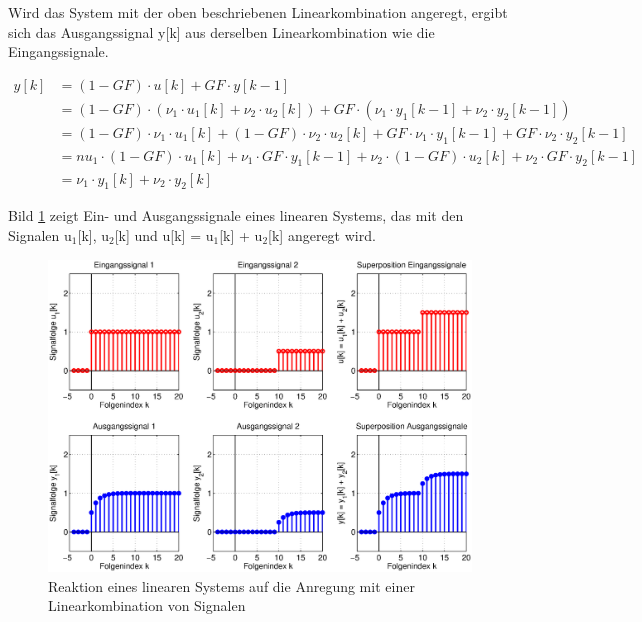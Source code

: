 \noindent Wird das System mit der oben beschriebenen Linearkombination angeregt, ergibt sich das Ausgangssignal y[k] aus derselben Linearkombination wie die Eingangssignale.

\begin{equation}\label{eq:fourtwentyfive}
\begin{split}
y\left[k\right] & = \left(1-GF\right)\cdot u\left[k\right]+GF\cdot y\left[k-1\right] \\ 
& = \left(1-GF\right)\cdot \left(\nu _{1} \cdot u_{1} \left[k\right]+\nu _{2} \cdot u_{2} \left[k\right]\right)+GF\cdot \left(\nu _{1} \cdot y_{1} \left[k-1\right]+\nu _{2} \cdot y_{2} \left[k-1\right]\right) \\ 
& = \left(1-GF\right)\cdot \nu _{1} \cdot u_{1} \left[k\right]+\left(1-GF\right)\cdot \nu _{2} \cdot u_{2} \left[k\right]+GF\cdot \nu _{1} \cdot y_{1} \left[k-1\right]+GF\cdot \nu _{2} \cdot y_{2} \left[k-1\right] \\ 
& = nu _{1} \cdot \left(1-GF\right)\cdot u_{1} \left[k\right]+\nu _{1} \cdot GF\cdot y_{1} \left[k-1\right]+\nu _{2} \cdot \left(1-GF\right)\cdot u_{2} \left[k\right]+\nu _{2} \cdot GF\cdot y_{2} \left[k-1\right] \\ 
& = \nu _{1} \cdot y_{1} \left[k\right]+\nu _{2} \cdot y_{2} \left[k\right]
\end{split}
\end{equation}

\noindent Bild \ref{fig:RekursivTiefpassLinearitaet} zeigt Ein- und Ausgangssignale eines linearen Systems, das mit den Signalen u${}_{1}$[k], u${}_{2}$[k] und u[k] = u${}_{1}$[k] + u${}_{2}$[k] angeregt wird. 

\begin{figure}[H]
  \centerline{\includegraphics[width=1\textwidth]{Kapitel4/Bilder/image7.eps}}
  \caption{Reaktion eines linearen Systems auf die Anregung mit einer Linearkombination von Signalen}
  \label{fig:RekursivTiefpassLinearitaet}
\end{figure}

